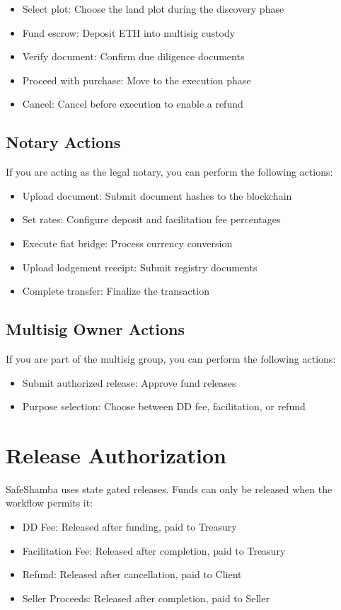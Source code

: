 \documentclass[11pt]{article}
\begin{document}
\begin{itemize}
\item Select plot: Choose the land plot during the discovery phase
\item Fund escrow: Deposit ETH into multisig custody
\item Verify document: Confirm due diligence documents
\item Proceed with purchase: Move to the execution phase
\item Cancel: Cancel before execution to enable a refund
\end{itemize}

\subsection{Notary Actions}
If you are acting as the legal notary, you can perform the following actions:

\begin{itemize}
\item Upload document: Submit document hashes to the blockchain
\item Set rates: Configure deposit and facilitation fee percentages
\item Execute fiat bridge: Process currency conversion
\item Upload lodgement receipt: Submit registry documents
\item Complete transfer: Finalize the transaction
\end{itemize}

\subsection{Multisig Owner Actions}
If you are part of the multisig group, you can perform the following actions:

\begin{itemize}
\item Submit authorized release: Approve fund releases
\item Purpose selection: Choose between DD fee, facilitation, or refund
\end{itemize}

\section{Release Authorization}
SafeShamba uses state gated releases. Funds can only be released when the workflow permits it:

\begin{itemize}
\item DD Fee: Released after funding, paid to Treasury
\item Facilitation Fee: Released after completion, paid to Treasury
\item Refund: Released after cancellation, paid to Client
\item Seller Proceeds: Released after completion, paid to Seller
\end{itemize}
\end{document}
